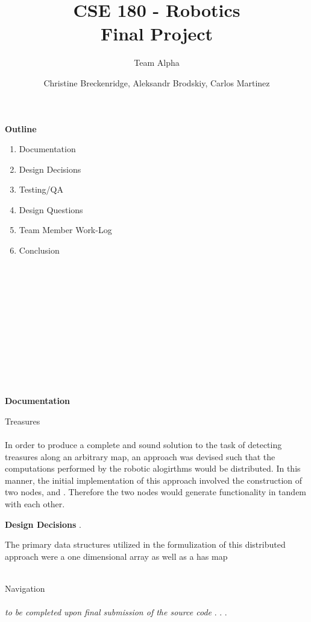 \documentclass[12pt]{article}
\title{CSE 180 - Robotics \\ Final Project}
\subtitle{Team Alpha}
\author{Christine Breckenridge, Aleksandr Brodskiy, Carlos Martinez}
\begin{document}
\maketitle
{\setlength{\parindent}{0cm}
\textbf{Outline}
\begin{enumerate}  
\item Documentation
\item Design Decisions
\item Testing/QA
\item Design Questions
\item Team Member Work-Log
\item Conclusion\\\\\\\\\\\\\\\\\\\\\\\\
\end{enumerate} 
}
{\setlength{\parindent}{0cm}
\textbf{Documentation} \\
\begin{center}Treasures\end{center}
\paragraph{} In order to produce a complete and sound solution to the task of detecting treasures along an arbitrary map, an approach was devised such that the computations performed by the robotic alogirthms would be distributed.
  In this manner, the initial implementation of this approach involved the construction of two nodes, \textbf{} and \textbf{}. Therefore the two nodes would generate functionality in tandem with each other.
  \begin{center}  \textbf{Design Decisions} . \end{center}
  The primary data structures utilized in the formulization of this distributed approach were a one dimensional array as well as a has map  
  \\\\
\begin{center}Navigation\end{center}
\paragraph{} \textit{to be completed upon final submission of the source code} . . . \\\\
}
\end{document}
